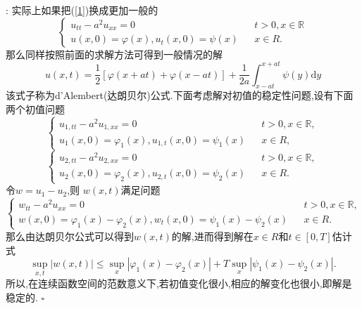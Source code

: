 \documentclass[a4paper]{article}
\newcommand\R{\ensuremath{\mathbb{R}}}
\newenvironment{pro}{{\noindent\bfseries 证明}:}{\hfill $\square$\par}
\begin{document}
\begin{pro}
实际上如果把(\ref{1})换成更加一般的
\begin{equation}
\left\{\begin{array}{lcr}
    u_{tt}-a^2u_{xx}=0& &t>0,x\in \R\\
    u(x,0)=\varphi(x), u_t(x,0)=\psi(x)&& x\in R.
  \end{array}\right.
\end{equation}
  那么同样按照前面的求解方法可得到一般情况的解
  \begin{equation}
    u(x,t)=\frac{1}{2}\left[ \varphi(x+at)+\varphi(x-at) \right]+\frac{1}{2a}\int_{x-at}^{x+at}\psi(y)\mathrm{d}y 
  \end{equation}
  该式子称为d'Alembert(达朗贝尔)公式.下面考虑解对初值的稳定性问题,设有下面两个初值问题
\begin{equation*}
\left\{\begin{array}{lcr}
    u_{1,tt}-a^2u_{1,xx}=0& &t>0,x\in \R,\\
    u_1(x,0)=\varphi_1(x), u_{1,t}(x,0)=\psi_1(x)&& x\in R,
  \end{array}\right.
\end{equation*}
\begin{equation*}
\left\{\begin{array}{lcr}
    u_{2,tt}-a^2u_{2,xx}=0& &t>0,x\in \R,\\
    u_2(x,0)=\varphi_2(x), u_{2,t}(x,0)=\psi_2(x)&& x\in R.
  \end{array}\right.
\end{equation*}
令$w=u_1-u_2$,则 $w(x,t)$满足问题
\begin{equation}
\left\{\begin{array}{lcr}
    w_{tt}-a^2u_{xx}=0& &t>0,x\in \R,\\
    w(x,0)=\varphi_1(x)-\varphi_2(x), w_t(x,0)=\psi_1(x)-\psi_2(x)&& x\in R.
  \end{array}\right.
\end{equation}
那么由达朗贝尔公式可以得到$w(x,t)$的解,进而得到解在$x\in R$和$t\in  \left[ 0,T \right] $估计式
 \[
   \sup_{x,t}\left| w(x,t) \right|\le \sup_{x}\left| \varphi_1(x)-\varphi_2(x) \right| +T\sup_{x}\left| \psi_1(x)-\psi_2(x) \right|  
.\]
所以,在连续函数空间的范数意义下,若初值变化很小,相应的解变化也很小,即解是稳定的.
\end{pro}
\end{document}
